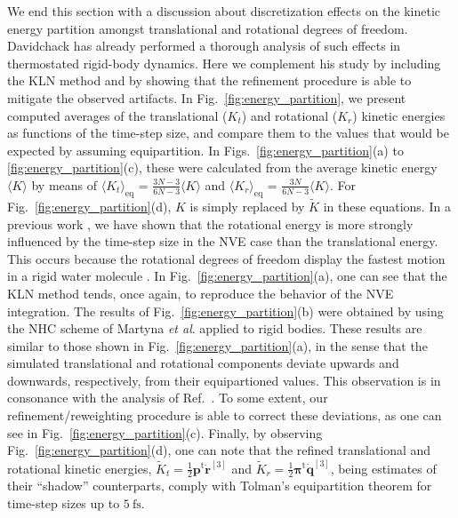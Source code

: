 \documentclass[
	aip,
	jcp,
	reprint,
]{revtex4-1}
\newcommand{\vt}[1]{\boldsymbol{\mathbf{#1}}}          %
\newcommand{\tr}[1]{#1^\text{t}}                       %
\newcommand{\refined}[1]{\widetilde{#1}}
\begin{document}
We end this section with a discussion about discretization effects on the kinetic energy partition amongst translational and rotational degrees of freedom.
Davidchack \cite{Davidchack_2010} has already performed a thorough analysis of such effects in thermostated rigid-body dynamics.
Here we complement his study by including the KLN method \cite{Kamberaj_2005} and by showing that the refinement procedure is able to mitigate the observed artifacts.
In Fig.~\ref{fig:energy_partition}, we present computed averages of the translational ($K_t$) and rotational ($K_r$) kinetic energies as functions of the time-step size, and compare them to the values that would be expected by assuming equipartition.
In Figs.~\ref{fig:energy_partition}(a) to \ref{fig:energy_partition}(c), these were calculated from the average kinetic energy $\langle K \rangle$ by means of $\langle K_t \rangle_\text{eq}$ = $\frac{3N-3}{6N-3} \langle K \rangle$ and $\langle K_r \rangle_\text{eq}$ = $\frac{3N}{6N-3} \langle K \rangle$.
For Fig.~\ref{fig:energy_partition}(d), $K$ is simply replaced by $\refined{K}$ in these equations.
In a previous work \cite{Silveira_2017}, we have shown that the rotational energy is more strongly influenced by the time-step size in the NVE case than the translational energy.
This occurs because the rotational degrees of freedom display the fastest motion in a rigid water molecule \cite{Silveira_2017}.
In Fig.~\ref{fig:energy_partition}(a), one can see that the KLN method \cite{Kamberaj_2005} tends, once again, to reproduce the behavior of the NVE integration.
The results of Fig.~\ref{fig:energy_partition}(b) were obtained by using the NHC scheme of Martyna \textit{et al}. \cite{Martyna_1996} applied to rigid bodies.
These results are similar to those shown in Fig.~\ref{fig:energy_partition}(a), in the sense that the simulated translational and rotational components deviate upwards and downwards, respectively, from their equipartioned values.
This observation is in consonance with the analysis of Ref.~.
To some extent, our refinement/reweighting procedure is able to correct these deviations, as one can see in Fig.~\ref{fig:energy_partition}(c).
Finally, by observing Fig.~\ref{fig:energy_partition}(d), one can note that the refined translational and rotational kinetic energies, 
$\refined K_t = \frac{1}{2} \tr{\vt p} \dot{\vt r}^{[3]}$ and $\refined K_r = \frac{1}{2} \tr{\vt \pi} \dot{\vt q}^{[3]}$, being estimates of their ``shadow'' counterparts, comply with Tolman's equipartition theorem \cite{Tolman_1918} for time-step sizes up to $5~\text{fs}$.
\end{document}
